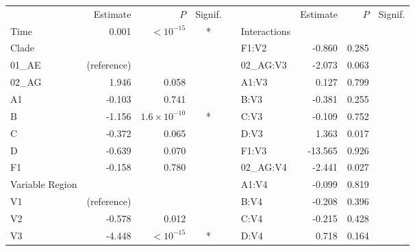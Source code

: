 \documentclass[12pt]{article}
\begin{document}
\begin{table}[htbp]
\renewcommand{\arraystretch}{1.15}
  \centering
  \begin{tabular}{lrrcclrrc}
    \hline
   & Estimate & $P$ & Signif.   &&  & Estimate & $P$ & Signif. \\ 
    \cline{1-4} \cline{6-9}
    
    Time & 0.001 & $<10^{-15}$ & * & & Interactions \\ 
	Clade  &  &  &  &  & \hspace{1em}F1:V2 & -0.860 & 0.285 &  \\ 
  \hspace{1em}01\_AE &  (reference) &  &  && \hspace{1em}02\_AG:V3 & -2.073 & 0.063 &  \\ 
  \hspace{1em}02\_AG & 1.946 & 0.058 &  &  &\hspace{1em}A1:V3 & 0.127 & 0.799 &  \\ 
  \hspace{1em}A1 & -0.103 & 0.741 &  & &\hspace{1em}B:V3 & -0.381 & 0.255 &  \\ 
  \hspace{1em}B & -1.156 & $1.6\times 10^{-10}$ & * & &\hspace{1em}C:V3 & -0.109 & 0.752 & \\ 
  \hspace{1em}C & -0.372 & 0.065 & &&\hspace{1em}D:V3 & 1.363 & 0.017 &  \\ 
  \hspace{1em}D & -0.639 & 0.070 & &&\hspace{1em}F1:V3 & -13.565 & 0.926 & \\ 
  \hspace{1em}F1 & -0.158 & 0.780 && & \hspace{1em}02\_AG:V4 & -2.441 & 0.027 & \\ 
  Variable Region  & & & & &\hspace{1em}A1:V4 & -0.099 & 0.819 & \\ 
  \hspace{1em}V1 & (reference) & & & &\hspace{1em}B:V4 & -0.208 & 0.396 & \\
  \hspace{1em}V2 & -0.578 & 0.012 &  & &\hspace{1em}C:V4 & -0.215 & 0.428 & \\ 
  \hspace{1em}V3 & -4.448 & $<10^{-15}$ & * &  &\hspace{1em}D:V4 & 0.718 & 0.164 &\\ 

\end{tabular}
\end{table}
\end{document}

